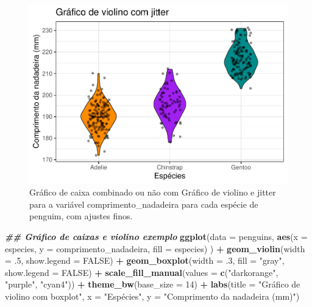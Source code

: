 \documentclass[
]{article}
\newenvironment{Shaded}{\begin{snugshade}}{\end{snugshade}}
\newcommand{\AttributeTok}[1]{\textcolor[rgb]{0.13,0.29,0.53}{#1}}
\newcommand{\ConstantTok}[1]{\textcolor[rgb]{0.56,0.35,0.01}{#1}}
\newcommand{\DecValTok}[1]{\textcolor[rgb]{0.00,0.00,0.81}{#1}}
\newcommand{\DocumentationTok}[1]{\textcolor[rgb]{0.56,0.35,0.01}{\textbf{\textit{#1}}}}
\newcommand{\FunctionTok}[1]{\textcolor[rgb]{0.13,0.29,0.53}{\textbf{#1}}}
\newcommand{\NormalTok}[1]{#1}
\newcommand{\SpecialCharTok}[1]{\textcolor[rgb]{0.81,0.36,0.00}{\textbf{#1}}}
\newcommand{\StringTok}[1]{\textcolor[rgb]{0.31,0.60,0.02}{#1}}
\begin{document}
\begin{figure}
\centering
\includegraphics{epr_files/figure-latex/fig-boxplot-violin-fino-2.pdf}
\caption{\label{fig:fig-boxplot-violin-fino-2}Gráfico de caixa combinado ou não com Gráfico de violino e jitter para a variável comprimento\_nadadeira para cada espécie de penguim, com ajustes finos.}
\end{figure}

\begin{Shaded}
\begin{Highlighting}[]
\DocumentationTok{\#\# Gráfico de caixas e violino exemplo}
\FunctionTok{ggplot}\NormalTok{(}\AttributeTok{data =}\NormalTok{ penguins, }
       \FunctionTok{aes}\NormalTok{(}\AttributeTok{x =}\NormalTok{ especies, }\AttributeTok{y =}\NormalTok{ comprimento\_nadadeira, }\AttributeTok{fill =}\NormalTok{ especies)}
\NormalTok{       ) }\SpecialCharTok{+}
    \FunctionTok{geom\_violin}\NormalTok{(}\AttributeTok{width =}\NormalTok{ .}\DecValTok{5}\NormalTok{, }\AttributeTok{show.legend =} \ConstantTok{FALSE}\NormalTok{) }\SpecialCharTok{+}
    \FunctionTok{geom\_boxplot}\NormalTok{(}\AttributeTok{width =}\NormalTok{ .}\DecValTok{3}\NormalTok{, }\AttributeTok{fill =} \StringTok{"gray"}\NormalTok{, }\AttributeTok{show.legend =} \ConstantTok{FALSE}\NormalTok{) }\SpecialCharTok{+}
    \FunctionTok{scale\_fill\_manual}\NormalTok{(}\AttributeTok{values =} \FunctionTok{c}\NormalTok{(}\StringTok{"darkorange"}\NormalTok{, }\StringTok{"purple"}\NormalTok{, }\StringTok{"cyan4"}\NormalTok{)) }\SpecialCharTok{+}
    \FunctionTok{theme\_bw}\NormalTok{(}\AttributeTok{base\_size =} \DecValTok{14}\NormalTok{) }\SpecialCharTok{+}
    \FunctionTok{labs}\NormalTok{(}\AttributeTok{title =} \StringTok{"Gráfico de violino com boxplot"}\NormalTok{, }\AttributeTok{x =} \StringTok{"Espécies"}\NormalTok{, }\AttributeTok{y =} \StringTok{"Comprimento da nadadeira (mm)"}\NormalTok{)}
\end{Highlighting}
\end{Shaded}
\end{document}
